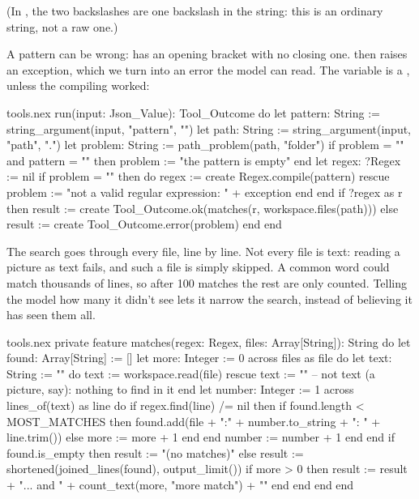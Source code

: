 (In , the two backslashes are one
backslash in the string: this is an ordinary string, not a raw one.)

A pattern can be wrong:  has an opening bracket with no
closing one.  then raises an exception, which we turn
into an error the model can read. The  variable is a
,  unless the compiling worked:

\begin{continued}{tools.nex}
  run(input: Json_Value): Tool_Outcome do
    let pattern: String := string_argument(input, "pattern", "")
    let path: String := string_argument(input, "path", ".")
    let problem: String := path_problem(path, "folder")
    if problem = "" and pattern = "" then
      problem := "the pattern is empty"
    end
    let regex: ?Regex := nil
    if problem = "" then
      do
        regex := create Regex.compile(pattern)
      rescue
        problem := "not a valid regular expression: " + exception
      end
    end
    if ?regex as r then
      result := create Tool_Outcome.ok(matches(r, workspace.files(path)))
    else
      result := create Tool_Outcome.error(problem)
    end
  end
\end{continued}

The search goes through every file, line by line. Not every file is text:
reading a picture as text fails, and such a file is simply skipped. A
common word could match thousands of lines, so after 100 matches the rest
are only counted. Telling the model how many it didn't see lets it narrow
the search, instead of believing it has seen them all.

\begin{continued}{tools.nex}
  private feature
    matches(regex: Regex, files: Array[String]): String do
      let found: Array[String] := []
      let more: Integer := 0
      across files as file do
        let text: String := ""
        do
          text := workspace.read(file)
        rescue
          text := ""     -- not text (a picture, say): nothing to find in it
        end
        let number: Integer := 1
        across lines_of(text) as line do
          if regex.find(line) /= nil then
            if found.length < MOST_MATCHES then
              found.add(file + ":" + number.to_string + ": " + line.trim())
            else
              more := more + 1
            end
          end
          number := number + 1
        end
      end
      if found.is_empty then
        result := "(no matches)"
      else
        result := shortened(joined_lines(found), output_limit())
        if more > 0 then
          result := result + "... and " + count_text(more, "more match") + "\n"
        end
      end
    end
end
\end{continued}

